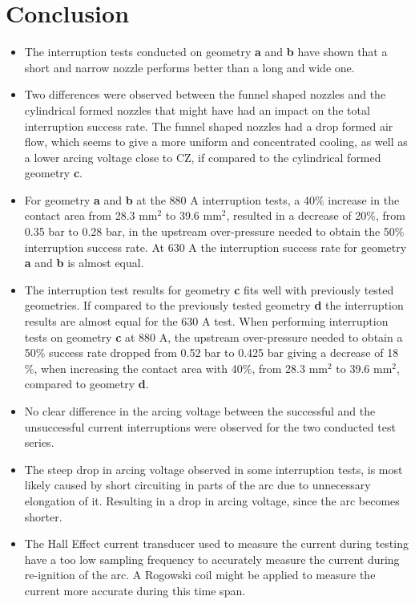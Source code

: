 \documentclass[10pt,b5paper,twoside]{article}
\begin{document}
\section{Conclusion}
\begin{itemize}
\item The interruption tests conducted on geometry \textbf{a} and \textbf{b} have shown that a short and narrow nozzle performs better than a long and wide one.

\item Two differences were observed between the funnel shaped nozzles and the cylindrical formed nozzles that might have had an impact on the total interruption success rate. The funnel shaped nozzles had a drop formed air flow, which seems to give a more uniform and concentrated cooling, as well as a lower arcing voltage close to CZ, if compared to the cylindrical formed geometry \textbf{c}.

\item For geometry \textbf{a} and \textbf{b} at the 880 A interruption tests, a 40\% increase in the contact area from 28.3 mm$^2$ to 39.6 mm$^2$, resulted in a decrease of 20\%, from 0.35 bar to 0.28 bar, in the upstream over-pressure needed to obtain the 50\% interruption success rate. At 630 A the interruption success rate for geometry \textbf{a} and \textbf{b} is almost equal.

\item The interruption test results for geometry \textbf{c} fits well with previously tested geometries. If compared to the previously tested geometry \textbf{d} the interruption results are almost equal for the 630 A test. When performing interruption tests on geometry \textbf{c} at 880 A, the upstream over-pressure needed to obtain a 50\% success rate dropped from 0.52 bar to 0.425 bar giving a decrease of 18 \%, when increasing the contact area with 40\%, from 28.3 mm$^2$ to 39.6 mm$^2$, compared to geometry \textbf{d}.

\item No clear difference in the arcing voltage between the successful and the unsuccessful current interruptions were observed for the two conducted test series.

\item The steep drop in arcing voltage observed in some interruption tests, is most likely caused by short circuiting in parts of the arc due to unnecessary elongation of it. Resulting in a drop in arcing voltage, since the arc becomes shorter.

\item The Hall Effect current transducer used to measure the current during testing have a too low sampling frequency to accurately measure the current during re-ignition of the arc. A Rogowski coil might be applied to measure the current more accurate during this time span.
\end{itemize}
\end{document}
